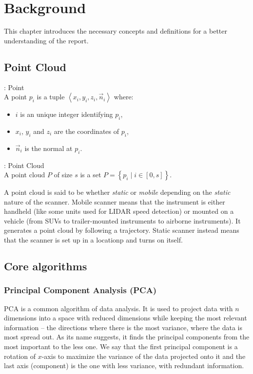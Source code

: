 \chapter{Background}
\label{ch:background}
This chapter introduces the necessary concepts and definitions for a better understanding of the report.

\section{Point Cloud}
\label{sc:back-point-cloud}
\begin{definition}{: Point}
  \\A point $p_i$ is a tuple $\left\langle x_i, y_i, z_i, \vec{n}_i \right\rangle$ where:
  \begin{itemize}
    \item $i$ is an unique integer identifying $p_i$,
    \item $x_i$, $y_i$ and $z_i$ are the coordinates of $p_i$,
    \item $\vec{n}_i$ is the normal at $p_i$.
  \end{itemize}
\end{definition}

\begin{definition}{: Point Cloud}
  \\A point cloud $P$ of size $s$ is a set $P = \left\lbrace p_i \mid i \in [0, s]  \right\rbrace$.
\end{definition}

A point cloud is said to be whether \emph{static} or \emph{mobile} depending on the \emph{static} nature of the scanner. Mobile scanner means that the instrument is either handheld (like some units used for LIDAR speed detection) or mounted on a vehicle (from SUVs to trailer-mounted instruments to airborne instruments). It generates a point cloud by following a trajectory. Static scanner instead means that the scanner is set up in a locationp and turns on itself.


\section{Core algorithms}

\subsection{Principal Component Analysis (PCA)}
\label{subsc:pca}
PCA is a common algorithm of data analysis. It is used to project data with $n$ dimensions into a space with reduced dimensions while keeping the most relevant information -- the directions where there is the most variance, where the data is most spread out. As its name suggests, it finds the principal components from the most important to the less one. We say that the first principal component is a rotation of $x$-axis to maximize the variance of the data projected onto it and the last axis (component) is the one with less variance, with redundant information.


